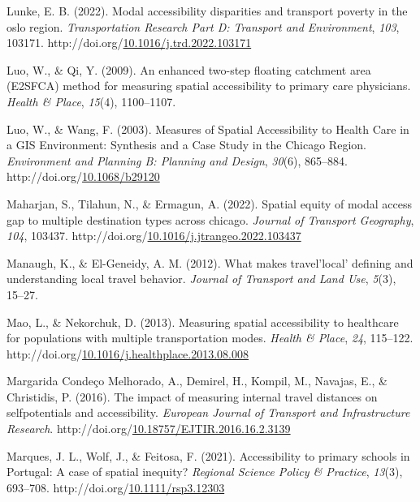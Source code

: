 \documentclass[
11pt, %
oneside, %
english, %
singlespacing, %
]{macthesis} %
\newlength{\cslhangindent}
\newenvironment{CSLReferences}[2] %
{\begin{list}{}{%
	\setlength{\itemindent}{0pt}
	\setlength{\leftmargin}{0pt}
	\setlength{\parsep}{0pt}
	\ifodd #1
	\setlength{\leftmargin}{\cslhangindent}
	\setlength{\itemindent}{-1\cslhangindent}
	\fi
	\setlength{\itemsep}{#2\baselineskip}}}
{\end{list}}
\begin{document}
\begin{CSLReferences}{1}{0}
Lunke, E. B. (2022). Modal accessibility disparities and transport poverty in the oslo region. \emph{Transportation Research Part D: Transport and Environment}, \emph{103}, 103171. http://doi.org/\href{https://doi.org/10.1016/j.trd.2022.103171}{10.1016/j.trd.2022.103171}

Luo, W., \& Qi, Y. (2009). An enhanced two-step floating catchment area ({E2SFCA}) method for measuring spatial accessibility to primary care physicians. \emph{Health \& Place}, \emph{15}(4), 1100--1107.

Luo, W., \& Wang, F. (2003). Measures of Spatial Accessibility to Health Care in a GIS Environment: Synthesis and a Case Study in the Chicago Region. \emph{Environment and Planning B: Planning and Design}, \emph{30}(6), 865--884. http://doi.org/\href{https://doi.org/10.1068/b29120}{10.1068/b29120}

Maharjan, S., Tilahun, N., \& Ermagun, A. (2022). Spatial equity of modal access gap to multiple destination types across chicago. \emph{Journal of Transport Geography}, \emph{104}, 103437. http://doi.org/\href{https://doi.org/10.1016/j.jtrangeo.2022.103437}{10.1016/j.jtrangeo.2022.103437}

Manaugh, K., \& El-Geneidy, A. M. (2012). What makes travel'local' defining and understanding local travel behavior. \emph{Journal of Transport and Land Use}, \emph{5}(3), 15--27.

Mao, L., \& Nekorchuk, D. (2013). Measuring spatial accessibility to healthcare for populations with multiple transportation modes. \emph{Health \& Place}, \emph{24}, 115--122. http://doi.org/\href{https://doi.org/10.1016/j.healthplace.2013.08.008}{10.1016/j.healthplace.2013.08.008}

Margarida Condeço Melhorado, A., Demirel, H., Kompil, M., Navajas, E., \& Christidis, P. (2016). The impact of measuring internal travel distances on selfpotentials and accessibility. \emph{European Journal of Transport and Infrastructure Research}. http://doi.org/\href{https://doi.org/10.18757/EJTIR.2016.16.2.3139}{10.18757/EJTIR.2016.16.2.3139}

Marques, J. L., Wolf, J., \& Feitosa, F. (2021). Accessibility to primary schools in {Portugal}: A case of spatial inequity? \emph{Regional Science Policy \& Practice}, \emph{13}(3), 693--708. http://doi.org/\href{https://doi.org/10.1111/rsp3.12303}{10.1111/rsp3.12303}


\end{CSLReferences}
\end{document}

